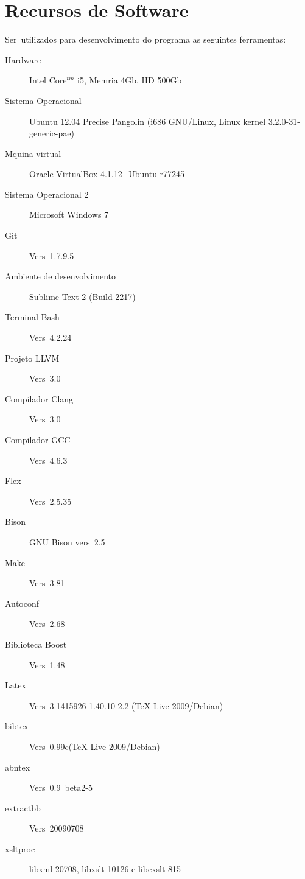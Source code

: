 \section{Recursos de Software}

\label{pro:recursos}

Ser\ao\ utilizados para desenvolvimento do programa as seguintes ferramentas:
\begin{description}
  \item[Hardware] Intel Core$^{tm}$ i5, Mem\oh ria 4Gb, HD 500Gb
  \item[Sistema Operacional] Ubuntu 12.04 Precise Pangolin (i686 GNU/Linux, Linux kernel 3.2.0-31-generic-pae)
  \item[M\ah quina virtual] Oracle VirtualBox 4.1.12\_Ubuntu r77245
  \item[Sistema Operacional 2] Microsoft Windows 7
  \item[Git] Vers\ao\ 1.7.9.5
  \item[Ambiente de desenvolvimento] Sublime Text 2 (Build 2217)
  \item[Terminal Bash] Vers\ao\ 4.2.24
  \item[Projeto LLVM] Vers\ao\ 3.0
  \item[Compilador Clang] Vers\ao\ 3.0
  \item[Compilador GCC] Vers\ao\ 4.6.3
  \item[Flex] \label{pro:flex}Vers\ao\ 2.5.35
  \item[Bison] \label{pro:bison}GNU Bison vers\ao\ 2.5
  \item[Make] Vers\ao\ 3.81
  \item[Autoconf] Vers\ao\ 2.68
  \item[Biblioteca Boost] Vers\ao\ 1.48
  \item[Latex] Vers\ao\ 3.1415926-1.40.10-2.2 (TeX Live 2009/Debian)
  \item[bibtex] Vers\ao\ 0.99c(TeX Live 2009/Debian)
  \item[abntex] Vers\ao\ 0.9~beta2-5
  \item[extractbb] Vers\ao\ 20090708
  \item[xsltproc] libxml 20708, libxslt 10126 e libexslt 815
\end{description}
